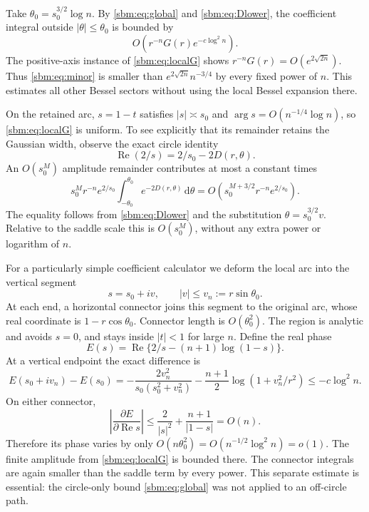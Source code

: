 \documentclass[11pt,letterpaper]{article}
\numberwithin{equation}{section}
\theoremstyle{remark}\newtheorem{remark}[theorem]{Remark}
\newcommand{\dd}{\,\mathrm d}
\newcommand{\Rea}{\operatorname{Re}}
\begin{document}
Take $\theta_0=s_0^{3/2}\log n$. By \eqref{sbm:eq:global} and
\eqref{sbm:eq:Dlower}, the coefficient integral outside
$|\theta|\leq\theta_0$ is bounded by
\begin{equation}\label{sbm:eq:minor}
 O\left(r^{-n}G(r)e^{-c\log^2n}\right).
\end{equation}
The positive-axis instance of \eqref{sbm:eq:localG} shows
$r^{-n}G(r)=O(e^{2\sqrt{2n}})$. Thus \eqref{sbm:eq:minor} is smaller than
$e^{2\sqrt{2n}}n^{-3/4}$ by every fixed power of $n$. This estimates
all other Bessel sectors without using the local Bessel expansion
there.

On the retained arc, $s=1-t$ satisfies $|s|\asymp s_0$ and
$\arg s=O(n^{-1/4}\log n)$, so \eqref{sbm:eq:localG} is uniform.
To see explicitly that its remainder retains the Gaussian width,
observe the exact circle identity
\begin{equation}\label{sbm:eq:Re2s}
 \Rea(2/s)=2/s_0-2D(r,\theta).
\end{equation}
An $O(s_0^M)$ amplitude remainder contributes at most a constant times
\[
 s_0^Mr^{-n}e^{2/s_0}
       \int_{-\theta_0}^{\theta_0}e^{-2D(r,\theta)}\dd\theta
  =O\left(s_0^{M+3/2}r^{-n}e^{2/s_0}\right).
\]
The equality follows from \eqref{sbm:eq:Dlower} and the substitution
$\theta=s_0^{3/2}v$. Relative to the saddle scale this is $O(s_0^M)$,
without any extra power or logarithm of $n$.

For a particularly simple coefficient calculator we deform the local
arc into the vertical segment
\[
 s=s_0+iv,\qquad |v|\leq v_n:=r\sin\theta_0.
\]
At each end, a horizontal connector joins this segment to the original
arc, whose real coordinate is $1-r\cos\theta_0$. Connector length is
$O(\theta_0^2)$. The region is analytic and avoids $s=0$, and stays
inside $|t|<1$ for large $n$.
Define the real phase
\[
 E(s)=\Rea\{2/s-(n+1)\log(1-s)\}.
\]
At a vertical endpoint the exact difference is
\begin{equation}\label{sbm:eq:endpoint}
 E(s_0+iv_n)-E(s_0)
  =-\frac{2v_n^2}{s_0(s_0^2+v_n^2)}
    -\frac{n+1}{2}\log(1+v_n^2/r^2)
  \leq-c\log^2n.
\end{equation}
On either connector,
\[
 \left|\frac{\partial E}{\partial\Rea s}\right|
 \leq\frac2{|s|^2}+\frac{n+1}{|1-s|}=O(n).
\]
Therefore its phase varies by only
$O(n\theta_0^2)=O(n^{-1/2}\log^2n)=o(1)$. The finite amplitude from
\eqref{sbm:eq:localG} is bounded there. The connector integrals are again
smaller than the saddle term by every power. This separate estimate
is essential: the circle-only bound \eqref{sbm:eq:global} was not applied
to an off-circle path.
\end{document}
